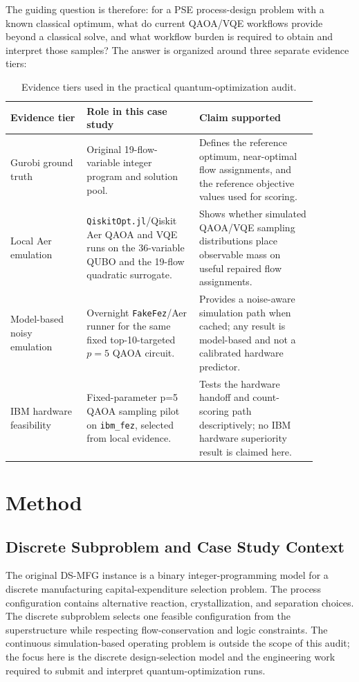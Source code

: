 The guiding question is therefore: for a PSE process-design problem with a known
classical optimum, what do current QAOA/VQE workflows provide beyond a classical
solve, and what workflow burden is required to obtain and interpret those
samples? The answer is organized around three separate evidence tiers:

\begin{table}[t]
\centering
\scriptsize
\caption{Evidence tiers used in the practical quantum-optimization audit.}
\label{tab:ds-mfg-evidence-tiers}
\begin{tabular}{p{0.22\linewidth}p{0.32\linewidth}p{0.34\linewidth}}
\hline
Evidence tier & Role in this case study & Claim supported \\
\hline
Gurobi ground truth & Original 19-flow-variable integer program and solution
pool. & Defines the reference optimum, near-optimal flow assignments, and the
reference objective values used for scoring. \\
\hline
Local Aer emulation & \texttt{QiskitOpt.jl}/Qiskit Aer QAOA and VQE runs on
the 36-variable QUBO and the 19-flow quadratic surrogate. & Shows whether
simulated QAOA/VQE sampling distributions place observable mass on useful
repaired flow assignments. \\
\hline
Model-based noisy emulation & Overnight \texttt{FakeFez}/Aer runner for the
same fixed top-10-targeted $p=5$ QAOA circuit. & Provides a noise-aware
simulation path when cached; any result is model-based and not a calibrated
hardware predictor. \\
\hline
IBM hardware feasibility & Fixed-parameter p=5 QAOA sampling pilot on
\texttt{ibm\_fez}, selected from local evidence. & Tests the hardware handoff
and count-scoring path descriptively; no IBM hardware superiority result is
claimed here. \\
\hline
\end{tabular}
\end{table}

\section{Method}
\label{sec:ds-mfg-method}

\subsection{Discrete Subproblem and Case Study Context}
\label{subsec:ds-mfg-discrete-subproblem}

The original DS-MFG instance is a binary integer-programming model for a
discrete manufacturing capital-expenditure selection problem. The process
configuration contains alternative reaction, crystallization, and separation
choices. The discrete subproblem selects one feasible configuration from the
superstructure while respecting flow-conservation and logic constraints. The
continuous simulation-based operating problem is outside the scope of this
audit; the focus here is the discrete design-selection model and the
engineering work required to submit and interpret quantum-optimization runs.

